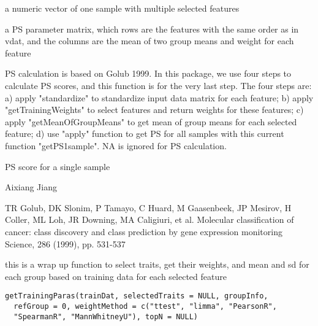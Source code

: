 \documentclass[letterpaper]{book}
\begin{document}
%
\begin{Arguments}
\begin{ldescription}
\item[\code{vdat}] a numeric vector of one sample with multiple selected features

\item[\code{PSpars}] a PS parameter matrix, which rows are the features with the same order as in vdat, 
and the columns are the mean of two group means and weight for each feature
\end{ldescription}
\end{Arguments}
%
\begin{Details}\relax
PS calculation is based on Golub 1999. In this package, we use four steps to calculate PS scores, 
and this function is for the very last step. 
The four steps are: a) apply "standardize" to standardize input data matrix for each feature; 
b) apply "getTrainingWeights" to select features and return weights for these features; 
c) apply "getMeanOfGroupMeans" to get mean of group means for each selected feature; 
d) use "apply" function to get PS for all samples with this current function "getPS1sample".
NA is ignored for PS calculation.
\end{Details}
%
\begin{Value}
PS score for a single sample
\end{Value}
%
\begin{Author}\relax
Aixiang Jiang
\end{Author}
%
\begin{References}\relax
TR Golub, DK Slonim, P Tamayo, C Huard, M Gaasenbeek, JP Mesirov, H Coller, ML Loh, JR Downing, MA Caligiuri, et al.
Molecular classification of cancer: class discovery and class prediction by gene expression monitoring
Science, 286 (1999), pp. 531-537
\end{References}
%
\begin{Description}\relax
this is a wrap up function to select traits, get their weights, and mean and sd for each group based on training data
for each selected feature
\end{Description}
%
\begin{Usage}
\begin{verbatim}
getTrainingParas(trainDat, selectedTraits = NULL, groupInfo,
  refGroup = 0, weightMethod = c("ttest", "limma", "PearsonR",
  "SpearmanR", "MannWhitneyU"), topN = NULL)
\end{verbatim}
\end{Usage}
\end{document}
